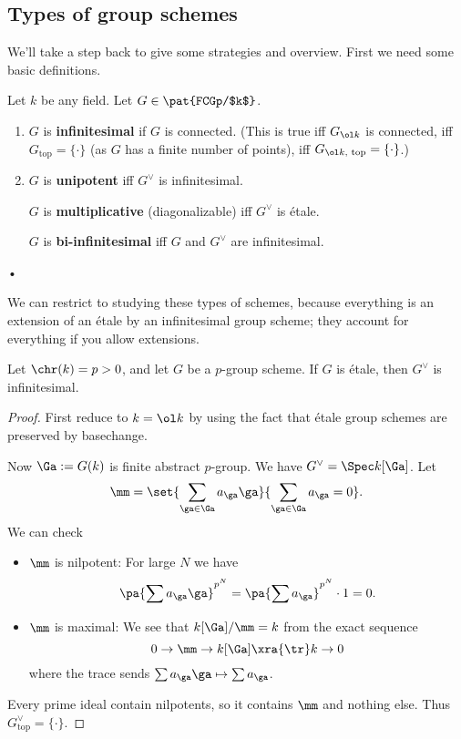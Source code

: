 \subsection{Types of group schemes}
We'll take a step back to give some strategies and overview. First we need some basic definitions.
\begin{df}
Let $k$ be any field. %
Let $G\in \pat{FCGp/$k$}$.
\begin{enumerate}
\item
$G$ is \textbf{infinitesimal} if $G$ is connected. (This is true iff $G_{\ol k}$ is connected, iff $G_{\text{top}}=\{\cdot\}$ (as $G$ has a finite number of points), iff $G_{\ol k,\text{ top}}=\{\cdot \}$.)
\item
$G$ is \textbf{unipotent} iff $G^{\vee}$ is infinitesimal. 

$G$ is \textbf{multiplicative} (diagonalizable) iff $G^{\vee}$ is \'etale.

$G$ is \textbf{bi-infinitesimal} iff $G$ and $G^{\vee}$ are infinitesimal.
\end{enumerate}•
\end{df}
We can restrict to studying these types of schemes, because everything is an extension of an \'etale by an infinitesimal group scheme; they account for everything if you allow extensions.
\begin{pr}
Let $\chr(k)=p>0$, and let $G$ be a $p$-group scheme. If $G$ is  \'etale, then $G^{\vee}$ is infinitesimal.
\end{pr}
\begin{proof}
First reduce to $k=\ol k$ by using the fact that \'etale group schemes are preserved by basechange.

Now $\Ga:=G(k)$ is finite abstract $p$-group.
We have $G^{\vee}=\Spec k[\Ga]$. 
Let
\[
\mm=\set{
\sum_{\ga\in \Ga} a_{\ga}\ga
}{\sum_{\ga\in \Ga} a_{\ga}=0}.
\]
We can check
\begin{itemize}
\item
$\mm$ is nilpotent: For large $N$ we have
\[
\pa{\sum a_{\ga}\ga}^{p^N} = \pa{\sum a_{\ga}}^{p^N}\cdot 1=0.
\]
\item
$\mm$ is maximal:
We see that $k[\Ga]/\mm=k$ from the exact sequence %
\[
0\to \mm \to k[\Ga]\xra{\tr} k\to 0
\]
where the trace sends $\sum a_{\ga}\ga\mapsto \sum a_{\ga}$.
\end{itemize}
Every prime ideal contain nilpotents, so it contains $\mm$ and  nothing else. Thus $G_{\text{top}}^{\vee}=\{\cdot\}$.
\end{proof}
